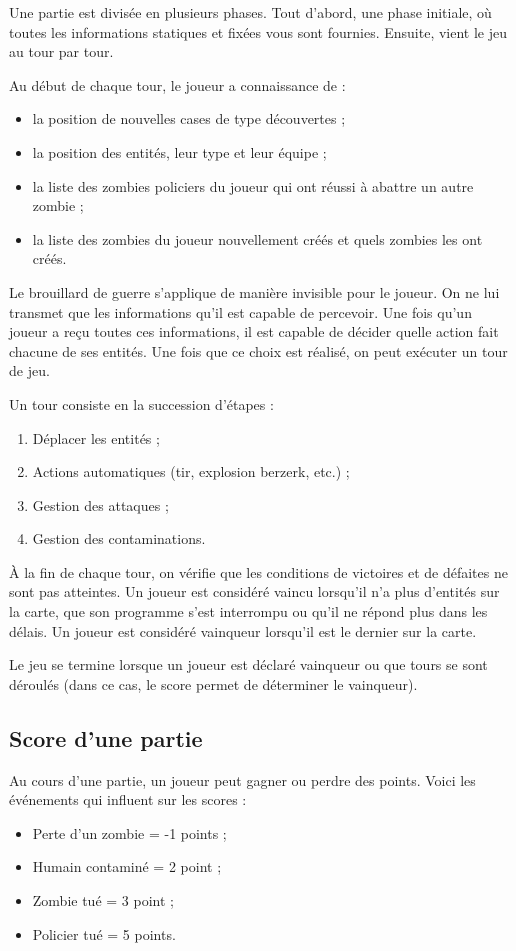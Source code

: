 Une partie est divisée en plusieurs phases.
Tout d'abord, une phase initiale, où toutes les informations statiques et fixées vous sont fournies.
Ensuite, vient le jeu au tour par tour.

Au début de chaque tour, le joueur a connaissance de :
\begin{itemize}
    \item la position de nouvelles cases de type \water{} découvertes ;
    \item la position des entités, leur type et leur équipe ;
    \item la liste des zombies policiers du joueur qui ont réussi à abattre un autre zombie ;
    \item la liste des zombies du joueur nouvellement créés et quels zombies les ont créés.
\end{itemize}

Le brouillard de guerre s'applique de manière invisible pour le joueur.
On ne lui transmet que les informations qu'il est capable de percevoir.
Une fois qu'un joueur a reçu toutes ces informations, il est capable de décider quelle action fait chacune de ses entités.
Une fois que ce choix est réalisé, on peut exécuter un tour de jeu.


Un tour consiste en la succession d'étapes :

\begin{enumerate}
    \item Déplacer les entités ;
    \item Actions automatiques (tir, explosion berzerk, etc.) ;
    \item Gestion des attaques ;
    \item Gestion des contaminations.
\end{enumerate}

À la fin de chaque tour, on vérifie que les conditions de victoires et de défaites ne sont pas atteintes.
Un joueur est considéré vaincu lorsqu'il n'a plus d'entités sur la carte, que son programme s'est interrompu ou qu'il ne répond plus dans les délais.
Un joueur est considéré vainqueur lorsqu'il est le dernier sur la carte.

Le jeu se termine lorsque un joueur est déclaré vainqueur ou que \turnmax{} tours se sont déroulés (dans ce cas, le score permet de déterminer le vainqueur).


\subsection{Score d'une partie} %
Au cours d'une partie, un joueur peut gagner ou perdre des points.
Voici les événements qui influent sur les scores :
\begin{itemize}
    \item Perte d'un zombie = -1 points ;
    \item Humain contaminé = 2 point ;
    \item Zombie tué = 3 point ;
    \item Policier tué = 5 points.
\end{itemize}

